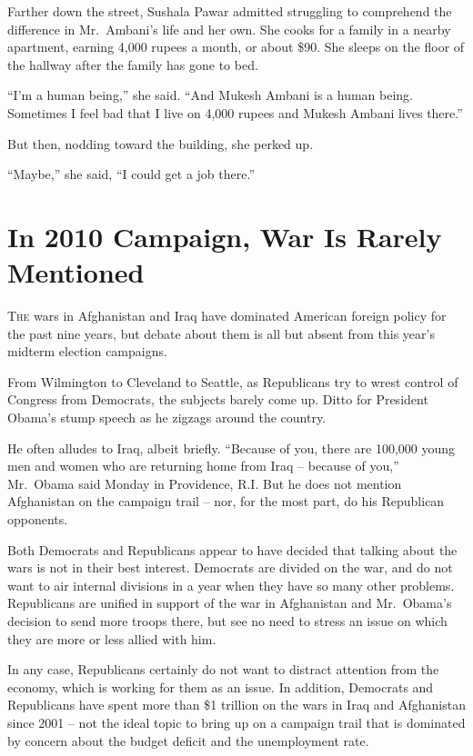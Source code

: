 ﻿\documentclass[12pt]{article}
\begin{document}
Farther down the street, Sushala Pawar admitted struggling to comprehend the difference in
Mr.~Ambani's life and her own. She cooks for a family in a nearby apartment, earning 4,000 rupees a
month, or about \$90. She sleeps on the floor of the hallway after the family has gone to bed.

``I'm a human being,'' she said. ``And Mukesh Ambani is a human being. Sometimes I feel bad that I
live on 4,000 rupees and Mukesh Ambani lives there.''

But then, nodding toward the building, she perked up.

``Maybe,'' she said, ``I could get a job there.''

\section{In 2010 Campaign, War Is Rarely Mentioned}

\lettrine{T}{he} wars in Afghanistan and Iraq have dominated American
foreign policy for the past nine years, but debate about them is all but absent from this year's
midterm election campaigns.

From Wilmington to Cleveland to Seattle, as Republicans try to wrest control of Congress from
Democrats, the subjects barely come up. Ditto for President Obama's stump speech as he zigzags
around the country.

He often alludes to Iraq, albeit briefly. ``Because of you, there are 100,000 young men and women
who are returning home from Iraq -- because of you,'' Mr.~Obama said Monday in Providence, R.I. But
he does not mention Afghanistan on the campaign trail -- nor, for the most part, do his Republican
opponents.

Both Democrats and Republicans appear to have decided that talking about the wars is not in their
best interest. Democrats are divided on the war, and do not want to air internal divisions in a year
when they have so many other problems. Republicans are unified in support of the war in Afghanistan
and Mr.~Obama's decision to send more troops there, but see no need to stress an issue on which they
are more or less allied with him.

In any case, Republicans certainly do not want to distract attention from the economy, which is
working for them as an issue. In addition, Democrats and Republicans have spent more than \$1
trillion on the wars in Iraq and Afghanistan since 2001 -- not the ideal topic to bring up on a
campaign trail that is dominated by concern about the budget deficit and the unemployment rate.
\end{document}
